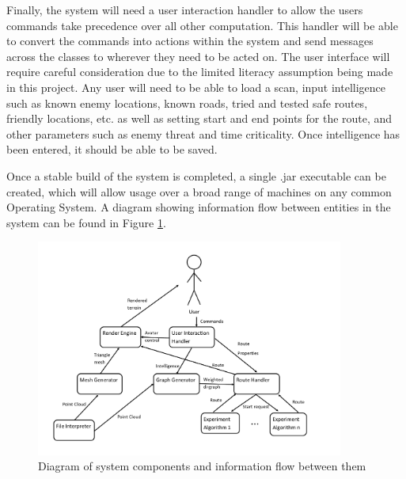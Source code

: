 \documentclass[12pt,a4paper]{article}
\begin{document}
  \par Finally, the system will need a user interaction handler to allow the user\textquotesingle s commands take precedence over all other computation. This handler will be able to convert the commands into actions within the system and send messages across the classes to wherever they need to be acted on. The user interface will require careful consideration due to the limited literacy assumption being made in this project. Any user will need to be able to load a scan, input intelligence such as known enemy locations, known roads, tried and tested safe routes, friendly locations, etc. as well as setting start and end points for the route, and other parameters such as enemy threat and time criticality. Once intelligence has been entered, it should be able to be saved.
  \par Once a stable build of the system is completed, a single .jar executable can be created, which will allow usage over a broad range of machines on any common Operating System. A diagram showing information flow between entities in the system can be found in Figure \ref{class_diagram_fig}.


  \begin{figure}[h]
    \centering
    \includegraphics[width=0.9\textwidth]{class_diagram}
    \caption{Diagram of system components and information flow between them}
    \label{class_diagram_fig}
  \end{figure}
\end{document}

